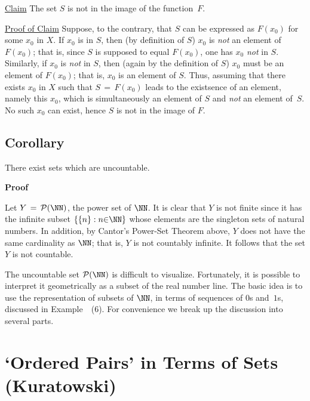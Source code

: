        \h \underline{Claim} The set $S$ is not in the image of the function~$F$.

        \h \underline{Proof of Claim} Suppose, to the contrary, that $S$ can be expressed as $F(x_{0})$ for some $x_{0}$ in $X$.
    If $x_{0}$ is in $S$, then (by definition of $S$) $x_{0}$ is {\em not} an element of  $F(x_{0})$; that is, since $S$ is supposed to equal $F(x_{0})$, one has $x_{0}$ {\em not} in $S$.
    Similarly, if $x_{0}$ is {\em not} in $S$, then (again by the definition of $S$) $x_{0}$ must be an element of $F(x_{0})$; that is, $x_{0}$ is an element of $S$.
    Thus, assuming that there exists $x_{0}$ in $X$ such that $S \,=\, F(x_{0})$ leads to the existsence of an element, namely this $x_{0}$,
    which is simultaneously an element of $S$ and {\em not} an element of~$S$. No such $x_{0}$ can exist, hence $S$ is not in the image of $F$.


\V
\V

            \subsection{\small{\bf Corollary}}

        There exist sets which are uncountable.

\V

        {\bf Proof}\, 

\V

        Let $Y \,=\, {\cal P}({\NN})$, the power set of ${\NN}$.
    It is clear that $Y$ is not finite since it has the infinite subset
    $\{\{n\}: n{\in}{\NN}\}$ whose elements are the singleton sets of natural numbers.
    In addition, by Cantor's Power-Set Theorem above, $Y$ does not have the same cardinality as ${\NN}$;
    that is, $Y$ is not countably infinite. It follows that the set $Y$ is not countable.

\V
\V

        The uncountable set ${\cal P}({\NN})$ is difficult to visualize. Fortunately, it is possible to interpret it geometrically as a subset of the real number line.
    The basic idea is to use the representation of subsets of ${\NN}$, in terms of sequences of $0$s and~$1$s, discussed in Example~~(6).
    For convenience we break up the discussion into several parts.

\V



                        \section{`Ordered Pairs' in Terms of Sets (Kuratowski)}


